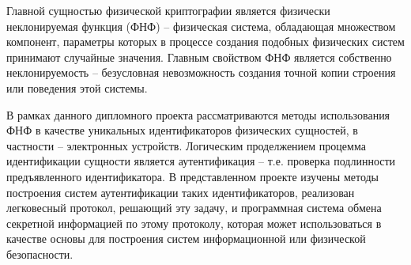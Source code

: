 Главной сущностью физической криптографии является физически неклонируемая функция (ФНФ) -- физическая система, обладающая множеством компонент, параметры которых в процессе создания подобных физических систем принимают случайные значения. Главным свойством ФНФ является собственно неклонируемость -- безусловная невозможность создания точной копии строения или поведения этой системы.

В рамках данного дипломного проекта рассматриваются методы использования ФНФ в качестве уникальных идентификаторов физических сущностей, в частности -- электронных устройств. Логическим проделжением процемма идентификации сущности является аутентификация -- т.е. проверка подлинности предъявленного идентификатора. В представленном проекте изучены методы построения систем аутентификации таких идентификаторов, реализован легковесный протокол, решающий эту задачу, и программная система обмена секретной информацией по этому протоколу, которая может использоваться в качестве основы для построения систем информационной или физической безопасности.
